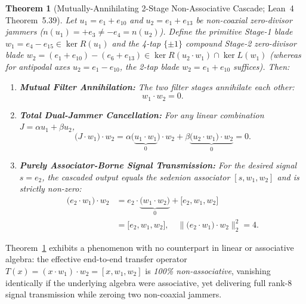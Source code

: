 \documentclass[journal,twoside]{IEEEtran}
\newtheorem{theorem}{Theorem}
\theoremstyle{definition}
\theoremstyle{remark}
\begin{document}
\begin{theorem}[Mutually-Annihilating 2-Stage Non-Associative Cascade; Lean~4 Theorem~5.39]
\label{thm:annihilating_cascade}
Let $u_1 = e_1 + e_{10}$ and $u_2 = e_1 + e_{13}$ be non-coaxial zero-divisor jammers ($n(u_1) = +e_3 \neq -e_4 = n(u_2)$). Define the primitive Stage-1 blade $w_1 = e_4 - e_{15} \in \ker R(u_1)$ and the 4-tap $\{\pm 1\}$ compound Stage-2 zero-divisor blade $w_2 = (e_1 + e_{10}) - (e_6 + e_{13}) \in \ker R(u_2 \cdot w_1) \cap \ker L(w_1)$ (whereas for antipodal axes $u_2 = e_1 - e_{10}$, the 2-tap blade $w_2 = e_1 + e_{10}$ suffices). Then:
\begin{enumerate}
    \item \textbf{Mutual Filter Annihilation:} The two filter stages annihilate each other:
    \begin{equation}
        w_1 \cdot w_2 = 0.
    \end{equation}
    \item \textbf{Total Dual-Jammer Cancellation:} For any linear combination $J = \alpha u_1 + \beta u_2$,
    \begin{equation}
        \bigl(J \cdot w_1\bigr) \cdot w_2 = \alpha \bigl(\underbrace{u_1 \cdot w_1}_{0}\bigr)\cdot w_2 + \beta \underbrace{\bigl(u_2 \cdot w_1\bigr)\cdot w_2}_{0} = 0.
    \end{equation}
    \item \textbf{Purely Associator-Borne Signal Transmission:} For the desired signal $s = e_2$, the cascaded output equals the sedenion associator $[s, w_1, w_2]$ and is strictly non-zero:
    \begin{equation}
    \begin{aligned}
        \bigl(e_2 \cdot w_1\bigr)\cdot w_2 &= e_2 \cdot \underbrace{\bigl(w_1 \cdot w_2\bigr)}_{0} + \bigl[e_2, w_1, w_2\bigr] \\
        &= \bigl[e_2, w_1, w_2\bigr], \quad \bigl\|\bigl(e_2 \cdot w_1\bigr)\cdot w_2\bigr\|_2^2 = 4.
    \end{aligned}
    \end{equation}
\end{enumerate}
\end{theorem}

Theorem~\ref{thm:annihilating_cascade} exhibits a phenomenon with no counterpart in linear or associative algebra: the effective end-to-end transfer operator $T(x) = (x\cdot w_1)\cdot w_2 = [x, w_1, w_2]$ is \emph{100\% non-associative}, vanishing identically if the underlying algebra were associative, yet delivering full rank-8 signal transmission while zeroing two non-coaxial jammers.
\end{document}
